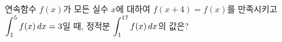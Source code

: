 연속함수 $f(x)$가 모든 실수 $x$에 대하여 $f(x+4)=f(x)$를 만족시키고 $\displaystyle\int_{1}^{5} f(x)\mkern3mu dx=3$일 때, 정적분 $\displaystyle\int_{1}^{17} f(x)\mkern3mu dx$의 값은?
